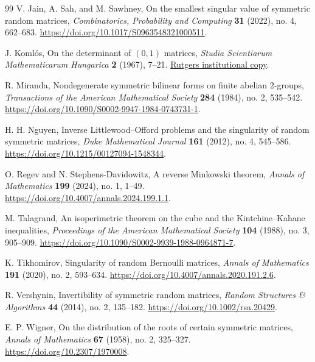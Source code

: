 \begin{thebibliography}{99}
V. Jain, A. Sah, and M. Sawhney,
On the smallest singular value of symmetric random matrices,
\emph{Combinatorics, Probability and Computing} \textbf{31} (2022),
no. 4, 662--683.
\url{https://doi.org/10.1017/S0963548321000511}.

J. Koml\'os,
On the determinant of \((0,1)\) matrices,
\emph{Studia Scientiarum Mathematicarum Hungarica} \textbf{2} (1967),
7--21.
\href{https://scholarship.libraries.rutgers.edu/esploro/outputs/journalArticle/On-the-determinant-of-0-1-matrices/991031550043104646}{Rutgers institutional copy}.

R. Miranda,
Nondegenerate symmetric bilinear forms on finite abelian 2-groups,
\emph{Transactions of the American Mathematical Society} \textbf{284}
(1984), no. 2, 535--542.
\url{https://doi.org/10.1090/S0002-9947-1984-0743731-1}.

H. H. Nguyen,
Inverse Littlewood--Offord problems and the singularity of random symmetric matrices,
\emph{Duke Mathematical Journal} \textbf{161} (2012), no. 4, 545--586.
\url{https://doi.org/10.1215/00127094-1548344}.

O. Regev and N. Stephens-Davidowitz,
A reverse Minkowski theorem,
\emph{Annals of Mathematics} \textbf{199} (2024), no. 1, 1--49.
\url{https://doi.org/10.4007/annals.2024.199.1.1}.

M. Talagrand,
An isoperimetric theorem on the cube and the Kintchine--Kahane inequalities,
\emph{Proceedings of the American Mathematical Society} \textbf{104}
(1988), no. 3, 905--909.
\url{https://doi.org/10.1090/S0002-9939-1988-0964871-7}.

K. Tikhomirov,
Singularity of random Bernoulli matrices,
\emph{Annals of Mathematics} \textbf{191} (2020), no. 2, 593--634.
\url{https://doi.org/10.4007/annals.2020.191.2.6}.

R. Vershynin,
Invertibility of symmetric random matrices,
\emph{Random Structures \& Algorithms} \textbf{44} (2014), no. 2,
135--182.
\url{https://doi.org/10.1002/rsa.20429}.

E. P. Wigner,
On the distribution of the roots of certain symmetric matrices,
\emph{Annals of Mathematics} \textbf{67} (1958), no. 2, 325--327.
\url{https://doi.org/10.2307/1970008}.

\end{thebibliography}
